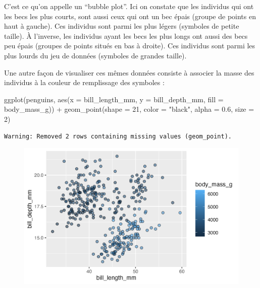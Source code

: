 \documentclass[
  letterpaper,
  DIV=11,
  numbers=noendperiod]{scrreprt}
\newenvironment{Shaded}{\begin{snugshade}}{\end{snugshade}}
\newcommand{\AttributeTok}[1]{\textcolor[rgb]{0.40,0.45,0.13}{#1}}
\newcommand{\DecValTok}[1]{\textcolor[rgb]{0.68,0.00,0.00}{#1}}
\newcommand{\FloatTok}[1]{\textcolor[rgb]{0.68,0.00,0.00}{#1}}
\newcommand{\FunctionTok}[1]{\textcolor[rgb]{0.28,0.35,0.67}{#1}}
\newcommand{\NormalTok}[1]{\textcolor[rgb]{0.00,0.23,0.31}{#1}}
\newcommand{\SpecialCharTok}[1]{\textcolor[rgb]{0.37,0.37,0.37}{#1}}
\newcommand{\StringTok}[1]{\textcolor[rgb]{0.13,0.47,0.30}{#1}}
\begin{document}
C'est ce qu'on appelle un ``bubble plot''. Ici on constate que les
individus qui ont les becs les plus courts, sont aussi ceux qui ont un
bec épais (groupe de points en haut à gauche). Ces individus sont parmi
les plus légers (symboles de petite taille). À l'inverse, les individus
ayant les becs les plus longs ont aussi des becs peu épais (groupes de
points situés en bas à droite). Ces individus sont parmi les plus lourds
du jeu de données (symboles de grandes taille).

Une autre façon de visualiser ces mêmes données consiste à associer la
masse des individus à la couleur de remplissage des symboles :

\begin{Shaded}
\begin{Highlighting}[]
\FunctionTok{ggplot}\NormalTok{(penguins, }\FunctionTok{aes}\NormalTok{(}\AttributeTok{x =}\NormalTok{ bill\_length\_mm, }\AttributeTok{y =}\NormalTok{ bill\_depth\_mm,}
                     \AttributeTok{fill =}\NormalTok{ body\_mass\_g)) }\SpecialCharTok{+}
  \FunctionTok{geom\_point}\NormalTok{(}\AttributeTok{shape =} \DecValTok{21}\NormalTok{, }\AttributeTok{color =} \StringTok{"black"}\NormalTok{, }\AttributeTok{alpha =} \FloatTok{0.6}\NormalTok{, }\AttributeTok{size =} \DecValTok{2}\NormalTok{)}
\end{Highlighting}
\end{Shaded}

\begin{verbatim}
Warning: Removed 2 rows containing missing values (geom_point).
\end{verbatim}

\begin{figure}[H]

{\centering \includegraphics{./03-visualization_files/figure-pdf/unnamed-chunk-76-1.png}

}

\end{figure}
\end{document}
